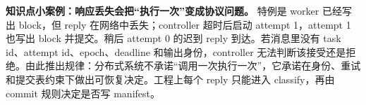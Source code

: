 \begin{casebox}
\textbf{知识点小案例：响应丢失会把“执行一次”变成协议问题。}
特例是 worker 已经写出 block，但 reply 在网络中丢失；controller 超时后启动 attempt 1，attempt 1 也写出 block 并提交。稍后 attempt 0 的迟到 reply 到达。若消息里没有 task id、attempt id、epoch、deadline 和输出身份，controller 无法判断该接受还是拒绝。由此推出规律：分布式系统不承诺“调用一次执行一次”，它承诺在身份、重试和提交表约束下做出可恢复决定。工程上每个 reply 只能进入 classify，再由 commit 规则决定是否写 manifest。
\end{casebox}
